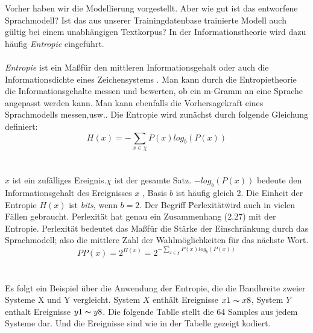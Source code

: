 Vorher haben wir die Modellierung vorgestellt. Aber wie gut ist das entworfene Sprachmodell? Ist das aus unserer Trainingdatenbase trainierte Modell auch g\"ultig bei einem unabh\"angigen Textkorpus? In der Informationstheorie wird dazu h\"aufig \emph{Entropie}  eingef\"uhrt.
\\
\\
\emph{Entropie} ist ein Ma\ss f\"ur den mittleren Informationsgehalt oder auch die Informationsdichte eines Zeichensystems \cite{int_entropie}. Man kann durch die Entropietheorie die Informationsgehalte messen und bewerten, ob ein m-Gramm an eine Sprache angepasst werden kann. Man kann ebenfalls die Vorhersagekraft eines Sprachmodells messen,usw..\cite{book_speech}
Die Entropie wird zun\"achst durch folgende Gleichung definiert:
\begin{equation}
\label{equation:bewertung_01}
H(x)=-\sum_{x\in\chi}P(x)log_{b}(P(x))
\end{equation}
\\
\\
$x$ ist ein zuf\"alliges Ereignis.$\chi$ ist der gesamte Satz. $-log_{b}(P(x))$ bedeute den Informationsgehalt des Ereignisses $x$ , Basis $b$ ist h\"aufig gleich 2. Die Einheit der Entropie $H(x)$ ist \emph{bits}, wenn $b=2$.
Der Begriff \"Perlexit\"at\" wird auch in vielen F\"allen gebraucht. Perlexit\"at hat genau ein Zusammenhang (2.27) mit der Entropie. Perlexit\"at bedeutet das Ma\ss f\"ur die St\"arke der Einschr\"ankung durch das Sprachmodell; also die mittlere Zahl der Wahlm\"oglichkeiten f\"ur das n\"achste Wort.
\begin{equation}
\label{equation:bewertung_02}
PP(x)=2^{H(x)}=2^{-\sum_{x\in\chi}P(x)log_{b}(P(x))}
\end{equation}
\\
\\
Es folgt ein Beispiel \"uber die Anwendung der Entropie, die die Bandbreite zweier Systeme X und Y vergleicht. System $X$ enth\"alt Ereignisse $x1\thicksim x8$, System $Y$ enthalt Ereignisse $y1\thicksim y8$. Die folgende Tablle stellt die 64 Samples aus jedem Systeme dar. Und die Ereignisse sind wie in der Tabelle gezeigt kodiert.
